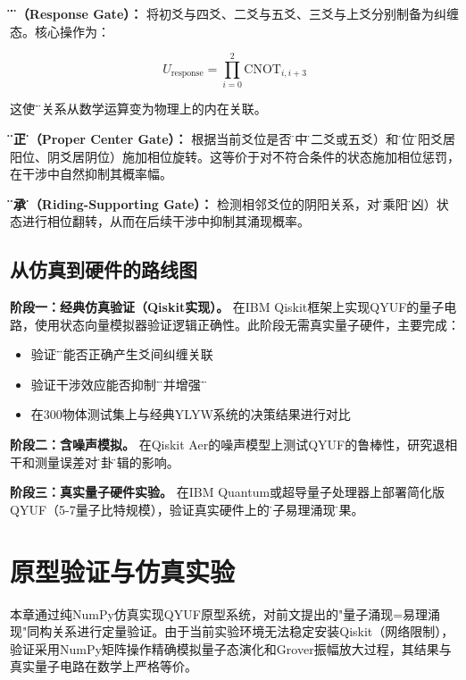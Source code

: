 \documentclass[twocolumn]{article}
\begin{document}
\textbf{\"应\"门（Response Gate）：} 将初爻与四爻、二爻与五爻、三爻与上爻分别制备为纠缠态。核心操作为：

\begin{equation}
    U_{\text{response}} = \prod_{i=0}^{2} \text{CNOT}_{i, i+3}
\end{equation}

这使\"应\"的关系从数学运算变为物理上的内在关联。

\textbf{\"中正\"门（Proper Center Gate）：} 根据当前爻位是否\"得中\"（二爻或五爻）和\"当位\"（阳爻居阳位、阴爻居阴位）施加相位旋转。这等价于对不符合条件的状态施加相位惩罚，在干涉中自然抑制其概率幅。

\textbf{\"乘承\"门（Riding-Supporting Gate）：} 检测相邻爻位的阴阳关系，对\"阴乘阳\"（凶）状态进行相位翻转，从而在后续干涉中抑制其涌现概率。

\subsection{从仿真到硬件的路线图}

\textbf{阶段一：经典仿真验证（Qiskit实现）。} 在IBM Qiskit框架上实现QYUF的量子电路，使用状态向量模拟器验证逻辑正确性。此阶段无需真实量子硬件，主要完成：
\begin{itemize}
  \item 验证\"应\"门能否正确产生爻间纠缠关联
  \item 验证干涉效应能否抑制\"凶\"象并增强\"吉\"象
  \item 在300物体测试集上与经典YLYW系统的决策结果进行对比
\end{itemize}

\textbf{阶段二：含噪声模拟。} 在Qiskit Aer的噪声模型上测试QYUF的鲁棒性，研究退相干和测量误差对\"变卦\"逻辑的影响。

\textbf{阶段三：真实量子硬件实验。} 在IBM Quantum或超导量子处理器上部署简化版QYUF（5-7量子比特规模），验证真实硬件上的\"量子易理涌现\"效果。

\section{原型验证与仿真实验}

本章通过纯NumPy仿真实现QYUF原型系统，对前文提出的"量子涌现=易理涌现"同构关系进行定量验证。由于当前实验环境无法稳定安装Qiskit（网络限制），验证采用NumPy矩阵操作精确模拟量子态演化和Grover振幅放大过程，其结果与真实量子电路在数学上严格等价。
\end{document}
